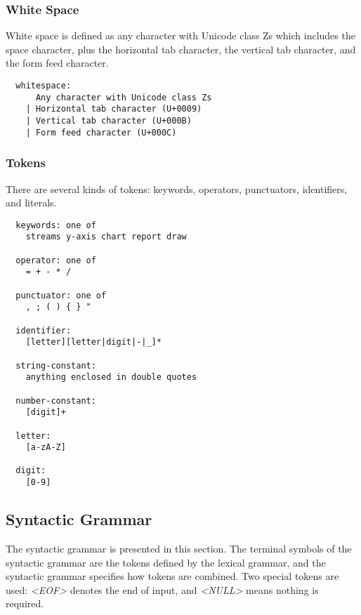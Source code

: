 \subsubsection{White Space}
White space is defined as any character with Unicode class Zs which includes the space character, plus the horizontal tab character, the vertical tab character, and the form feed character.
\begin{verbatim}
  whitespace:
      Any character with Unicode class Zs
    | Horizontal tab character (U+0009)
    | Vertical tab character (U+000B)
    | Form feed character (U+000C)
\end{verbatim}


\subsubsection{Tokens}
There are several kinds of tokens: keywords, operators, punctuators, identifiers, and literals.
\begin{verbatim}    
  keywords: one of
    streams y-axis chart report draw

  operator: one of
    = + - * /  
    
  punctuator: one of
    , ; ( ) { } "
    
  identifier:
    [letter][letter|digit|-|_]*

  string-constant:
    anything enclosed in double quotes
    
  number-constant:
    [digit]+  
    
  letter:
    [a-zA-Z]
    
  digit:
    [0-9]
\end{verbatim}


 
     
     
     

\subsection{Syntactic Grammar}

The syntactic grammar is presented in this section. The terminal symbols of the syntactic grammar are the tokens defined by the lexical grammar, and the syntactic grammar specifies how tokens are combined. Two special tokens are used: \textit{\textless EOF\textgreater} denotes the end of input, and \textit{\textless NULL\textgreater} means nothing is required.


